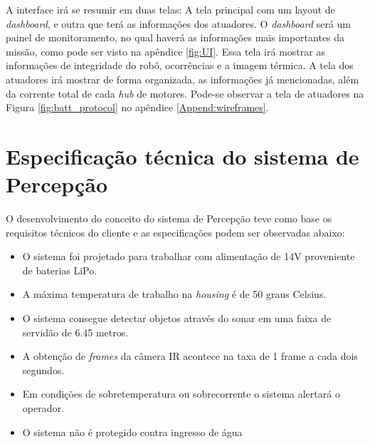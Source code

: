 A interface irá se resumir em duas telas: A tela principal com um layout de \textit{dashboard}, e outra que terá as informações dos atuadores. O \textit{dashboard} será um painel de monitoramento, no qual haverá as informações mais importantes da missão, como pode ser visto na apêndice \ref{fig:UI}. Essa tela irá mostrar as informações de integridade do robô, ocorrências e a imagem térmica. A tela dos atuadores irá mostrar de forma organizada, as informações já mencionadas, além da corrente total de cada \textit{hub} de motores. Pode-se observar a tela de atuadores na Figura \ref{fig:batt_protocol} no apêndice \ref{Append:wireframes}.


\section{Especificação técnica do sistema de Percepção}
\label{ssec:espt}

O desenvolvimento do conceito do sistema de Percepção teve como base os requisitos técnicos do cliente e as especificações podem ser observadas abaixo:
\begin{itemize}
\item O sistema foi projetado para trabalhar com alimentação de 14V proveniente de baterias LiPo.
\item A máxima temperatura de trabalho na \textit{housing} é de 50 graus Celsius.
\item O sistema consegue detectar objetos através do sonar em uma faixa de servidão de 6.45 metros.
\item A obtenção de \textit{frames} da câmera IR acontece na taxa de 1 frame a cada dois segundos.
\item Em condições de sobretemperatura ou sobrecorrente o sistema alertará o operador.
\item O sistema não é protegido contra ingresso de água
\end{itemize} 




